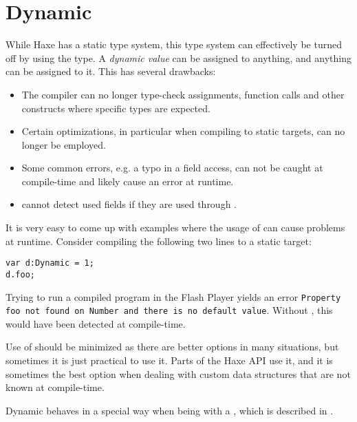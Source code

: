 \section{Dynamic}
\label{types-dynamic}

While Haxe has a static type system, this type system can effectively be turned off by using the  type. A \emph{dynamic value} can be assigned to anything, and anything can be assigned to it. This has several drawbacks:

\begin{itemize}
	\item The compiler can no longer type-check assignments, function calls and other constructs where specific types are expected.
	\item Certain optimizations, in particular when compiling to static targets, can no longer be employed.
	\item Some common errors, e.g. a typo in a field access, can not be caught at compile-time and likely cause an error at runtime.
	\item {} cannot detect used fields if they are used through .
\end{itemize}
It is very easy to come up with examples where the usage of  can cause problems at runtime. Consider compiling the following two lines to a static target:

\begin{lstlisting}
var d:Dynamic = 1;
d.foo;
\end{lstlisting}
Trying to run a compiled program in the Flash Player yields an error \texttt{Property foo not found on Number and there is no default value}. Without , this would have been detected at compile-time.


Use of  should be minimized as there are better options in many situations, but sometimes it is just practical to use it. Parts of the Haxe  API use it, and it is sometimes the best option when dealing with custom data structures that are not known at compile-time.

Dynamic behaves in a special way when being  with a , which is described in .

